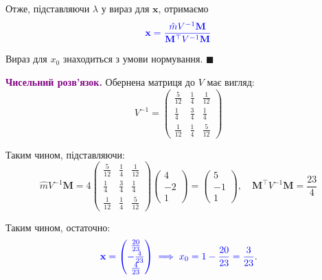 \documentclass{test_template}
\begin{document}
Отже, підставляючи $\lambda$ у вираз для $\mathbf{x}$, отримаємо
\begin{equation*}
    \textcolor{blue}{\mathbf{x} = \frac{\hat{m}V^{-1}\mathbf{M}}{\mathbf{M}^{\top}V^{-1}\mathbf{M}}}
\end{equation*}

Вираз для $x_0$ знаходиться з умови нормування. \hfill $\blacksquare$

\vspace{10px}

\textcolor{purple}{\textbf{Чисельний розв'язок.}} Обернена матриця
до $V$ має вигляд:
\begin{equation*}
    V^{-1} = \begin{pmatrix}
        \frac{5}{12} & \frac{1}{4} & \frac{1}{12} \\
        \frac{1}{4} & \frac{3}{4} & \frac{1}{4} \\
        \frac{1}{12} & \frac{1}{4} & \frac{5}{12}
    \end{pmatrix}
\end{equation*}

Таким чином, підставляючи:
\begin{equation*}
    \hat{m}V^{-1}\mathbf{M} = 4\begin{pmatrix}
        \frac{5}{12} & \frac{1}{4} & \frac{1}{12} \\
        \frac{1}{4} & \frac{3}{4} & \frac{1}{4} \\
        \frac{1}{12} & \frac{1}{4} & \frac{5}{12}
    \end{pmatrix}\begin{pmatrix}
        4 \\ -2 \\ 1
    \end{pmatrix} = \begin{pmatrix}
        5 \\ -1 \\ 1
    \end{pmatrix}, \quad \mathbf{M}^{\top}V^{-1}\mathbf{M} = \frac{23}{4}
\end{equation*}

Таким чином, остаточно:
\begin{equation*}
    \textcolor{blue}{\mathbf{x} = \begin{pmatrix}
        \frac{20}{23} \\ -\frac{4}{23} \\ \frac{4}{23}
    \end{pmatrix} \implies x_0 = 1-\frac{20}{23} = \frac{3}{23}}.
\end{equation*}
\end{document}
